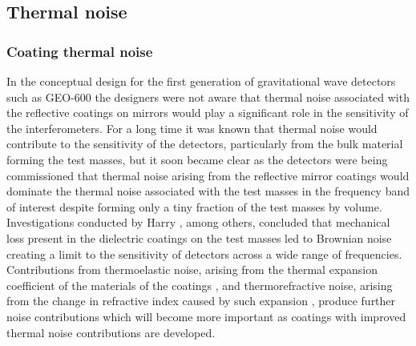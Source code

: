 

\subsection{Thermal noise}

\subsubsection{Coating thermal noise}
In the conceptual design for the first generation of gravitational wave detectors such as GEO-600 \cite{Willke2002} the designers were not aware that thermal noise associated with the reflective coatings on mirrors would play a significant role in the sensitivity of the interferometers. For a long time it was known that thermal noise would contribute to the sensitivity of the detectors, particularly from the bulk material forming the test masses, but it soon became clear as the detectors were being commissioned that thermal noise arising from the reflective mirror coatings would dominate the thermal noise associated with the test masses in the frequency band of interest despite forming only a tiny fraction of the test masses by volume. Investigations conducted by Harry \etal{} \cite{Harry2002, Harry2007}, among others, concluded that mechanical loss present in the dielectric coatings on the test masses led to Brownian noise creating a limit to the sensitivity of detectors across a wide range of frequencies. Contributions from thermoelastic noise, arising from the thermal expansion coefficient of the materials of the coatings \cite{Braginsky1999a}, and thermorefractive noise, arising from the change in refractive index caused by such expansion \cite{Braginsky2000a}, produce further noise contributions which will become more important as coatings with improved thermal noise contributions are developed.

